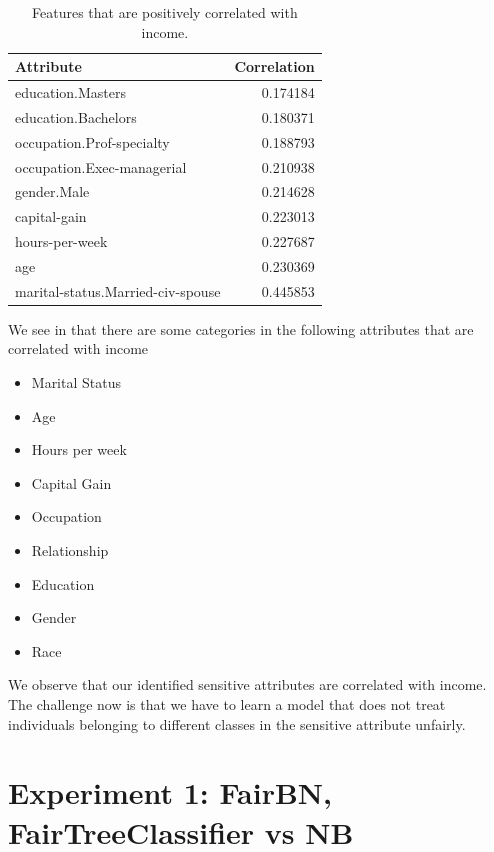 \begin{table}
    \centering
    \begin{tabular}{lr}
        \toprule
        Attribute &  Correlation \\
        \midrule
        education.Masters                 &     0.174184 \\
        education.Bachelors               &     0.180371 \\
        occupation.Prof-specialty         &     0.188793 \\
        occupation.Exec-managerial        &     0.210938 \\
        gender.Male                       &     0.214628 \\
        capital-gain                      &     0.223013 \\
        hours-per-week                    &     0.227687 \\
        age                               &     0.230369 \\
        marital-status.Married-civ-spouse &     0.445853 \\
        \bottomrule
    \end{tabular}
    \caption{Features that are positively correlated with income.}
    \label{fig:positive_income_correaltion}
\end{table}

We see  in that there are some categories in the following attributes that are correlated with income

\begin{itemize}
    \item Marital Status
    \item Age
    \item Hours per week
    \item Capital Gain
    \item Occupation
    \item Relationship
    \item Education
    \item Gender
    \item Race
\end{itemize}

We observe that our identified sensitive attributes are correlated with income. The challenge now is that we have to learn a model that does not treat individuals belonging to different classes in the sensitive attribute unfairly.

\section{Experiment 1: FairBN, FairTreeClassifier vs NB}


